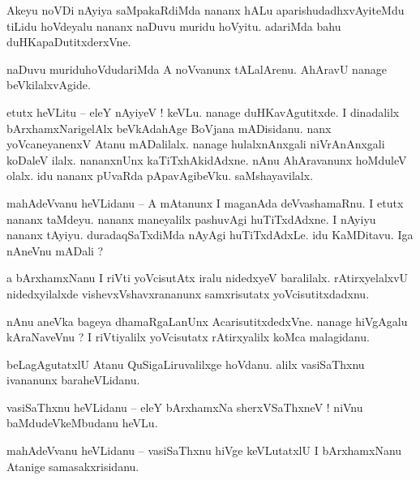 \documentclass{article}
\begin{document}
\begin{mn}%
Akeyu noVDi nAyiya saMpakaRdiMda nananx hALu aparishudadhxvAyiteMdu tiLidu hoVdeyalu nananx naDuvu 
muridu hoVyitu. adariMda bahu duHKapaDutitxderxVne.
\end{mn}

\begin{mn}%
naDuvu muriduhoVdudariMda A noVvanunx tALalArenu. AhAravU nanage beVkilalxvAgide.
\end{mn}

\begin{mn}%
etutx heVLitu -- eleY nAyiyeV ! keVLu. nanage duHKavAgutitxde. I dinadalilx bArxhamxNarigelAlx 
beVkAdahAge  BoVjana mADisidanu. nanx yoVcaneyanenxV Atanu mADalilalx. nanage hulalxnAnxgali 
niVrAnAnxgali koDaleV ilalx. nananxnUnx kaTiTxhAkidAdxne. nAnu AhAravanunx hoMduleV olalx. idu 
nananx pUvaRda pApavAgibeVku. saMshayavilalx.
\end{mn}

\begin{mn}%
mahAdeVvanu heVLidanu -- A mAtanunx I maganAda deVvashamaRnu. I etutx nananx taMdeyu. nananx 
maneyalilx pashuvAgi huTiTxdAdxne. I nAyiyu nananx tAyiyu. duradaqSaTxdiMda nAyAgi huTiTxdAdxLe. 
idu KaMDitavu. Iga nAneVnu mADali ?
\end{mn}

\begin{mn}%
a bArxhamxNanu I riVti yoVcisutAtx iralu nidedxyeV baralilalx. rAtirxyelalxvU nidedxyilalxde 
vishevxVshavxrananunx samxrisutatx yoVcisutitxdadxnu.
\end{mn}

\begin{mn}%
nAnu aneVka bageya dhamaRgaLanUnx AcarisutitxdedxVne. nanage hiVgAgalu kAraNaveVnu ? I riVtiyalilx 
yoVcisutatx rAtirxyalilx koMca malagidanu.
\end{mn}

\begin{mn}%
beLagAgutatxlU Atanu QuSigaLiruvalilxge hoVdanu. alilx vasiSaThxnu ivananunx baraheVLidanu.
\end{mn}

\begin{mn}%
vasiSaThxnu heVLidanu -- eleY bArxhamxNa sherxVSaThxneV ! niVnu baMdudeVkeMbudanu heVLu.
\end{mn}

\begin{mn}%
mahAdeVvanu heVLidanu -- vasiSaThxnu hiVge keVLutatxlU I bArxhamxNanu Atanige samasakxrisidanu.
\end{mn}
\end{document}
